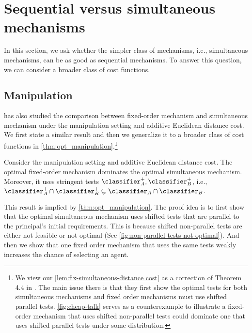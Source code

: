 \section{Sequential  versus simultaneous mechanisms}\label{sec: general costs}

In this section, we ask whether the simpler class of mechanisms, i.e., simultaneous mechanisms, can be as good as sequential mechanisms. 
To answer this question, we can consider a broader class of cost functions.

\subsection{Manipulation}
 \citet{zigzag} has also studied the comparison between fixed-order mechanism and simultaneous mechanism under the manipulation setting and additive Euclidean distance cost.
 We first state a similar result and then we generalize it to a broader class of cost functions in \cref{thm:opt_manipulation}.\footnote{We view our \cref{lem:fix-simultaneous-distance cost} as a correction of Theorem 4.4 in \citet{zigzag}. 
The main issue there is that they first show the optimal tests for both simultaneous mechanisms and fixed order mechanisms must use shifted parallel tests.
\cref{fig:cheap-talk} serves as a counterexample to illustrate a fixed-order mechanism that uses shifted non-parallel tests could dominate one that uses shifted parallel tests under some distribution.
}
\begin{proposition}\label{lem:fix-simultaneous-distance cost}
Consider the manipulation setting and additive Euclidean distance cost.
    The optimal fixed-order mechanism dominates the optimal simultaneous mechanism. Moreover, it uses stringent tests $\classifier_A^+, \classifier_B^+$, i.e., $\classifier_A^+  \cap \classifier_B^+ \subsetneq \classifier_A\cap \classifier_B$.
\end{proposition}
This result is implied by \cref{thm:opt_manipulation}.
The proof idea  is to first show that the optimal simultaneous mechanism uses shifted tests that are parallel to the principal's initial requirements.
This is because shifted non-parallel tests are either not feasible or not optimal (See \cref{fig:non-parallel tests not optimal}).
And then we show that one fixed order mechanism that uses the same tests weakly increases the chance of selecting an agent. 


